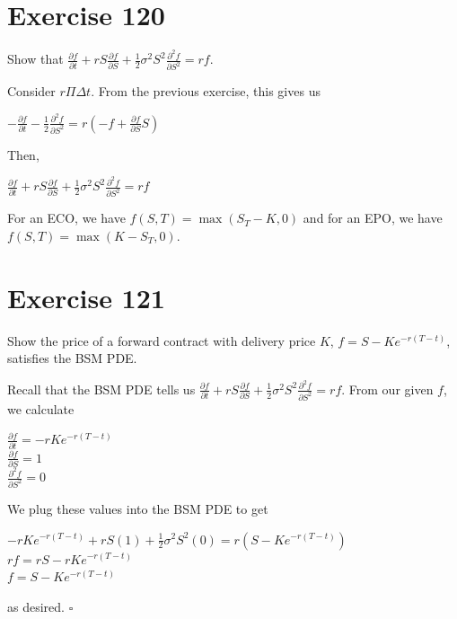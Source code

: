 \documentclass{article}
\begin{document}
\section*{Exercise 120}
Show that $\frac{\partial f}{\partial t}+rS\frac{\partial f}{\partial S}+\frac{1}{2}\sigma^2S^2\frac{\partial^2f}{\partial S^2}=rf$.
\begin{flushleft}
    Consider $r\Pi\Delta t$. From the previous exercise, this gives us
    \begin{center}
        $-\frac{\partial f}{\partial t} - \frac{1}{2}\frac{\partial^2f}{\partial S^2} = r(-f + \frac{\partial f}{\partial S}S)$
    \end{center}
    Then,
    \begin{center}
        $\frac{\partial f}{\partial t} + rS \frac{\partial f}{\partial S} + \frac{1}{2} \sigma^2S^2 \frac{\partial^2 f}{\partial S^2} = rf$
    \end{center}
    For an ECO, we have $f(S, T) = \max(S_T - K, 0)$ and for an EPO, we have $f(S,T) = \max(K-S_T, 0)$.
\end{flushleft}

\section*{Exercise 121}
Show the price of a forward contract with delivery price $K$, $f = S - Ke^{-r(T-t)}$, satisfies the BSM PDE.
\begin{flushleft}
    Recall that the BSM PDE tells us $\frac{\partial f}{\partial t}+rS\frac{\partial f}{\partial S}+\frac{1}{2}\sigma^2S^2\frac{\partial^2f}{\partial S^2}=rf$.
    From our given $f$, we calculate
    \begin{center}
        $\frac{\partial f}{\partial t} = -rKe^{-r(T-t)}$ \\
        $\frac{\partial f}{\partial S} = 1$ \\
        $\frac{\partial^2f}{\partial S^2} = 0$
    \end{center}
    We plug these values into the BSM PDE to get
    \begin{center}
        $-rKe^{-r(T-t)} + rS(1) + \frac{1}{2} \sigma^2 S^2 (0) = r(S-Ke^{-r(T-t)})$ \\
        $rf = rS - rKe^{-r(T-t)}$ \\
        $f = S-Ke^{-r(T-t)}$
    \end{center}
    as desired. $\square$
\end{flushleft}
\end{document}
